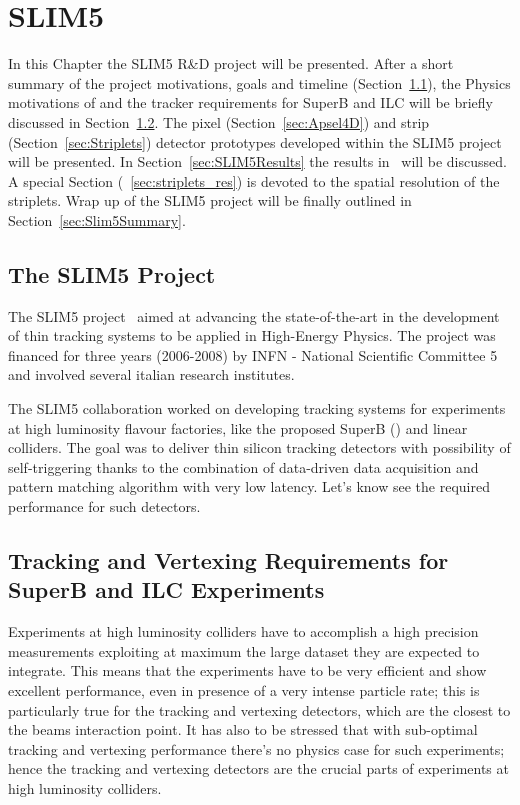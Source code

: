 \chapter{SLIM5}
\label{chap:SLIM5}
In this Chapter the SLIM5 R\&D project will be presented. After a short summary of the project 
motivations, goals and timeline (Section~\ref{sec:SLIM5Project}), the Physics motivations of 
and the tracker requirements for SuperB and ILC will be briefly discussed in Section~\ref{sec:HLExp}. 
The pixel  (Section~\ref{sec:Apsel4D}) and strip (Section~\ref{sec:Striplets}) 
detector prototypes developed 
within the SLIM5 project will be presented. In Section~\ref{sec:SLIM5Results} the results 
in~\cite{BETTARINI2010942,BOMBEN2010159,NERI2010195} will be discussed. 
A special Section (~\ref{sec:striplets_res}) is devoted to the spatial resolution of the striplets. 
Wrap up of the SLIM5 project will be finally outlined in Section~\ref{sec:Slim5Summary}.


\section{The SLIM5 Project}
\label{sec:SLIM5Project}
The SLIM5 project~\cite{SLIM5:proj} aimed at advancing the state-of-the-art in the development of thin 
tracking systems to be applied in High-Energy Physics. The project was financed for three years
 (2006-2008) by INFN - National Scientific Committee 5~\cite{INFN_V} and involved several 
 italian research institutes. 
 
 The SLIM5 collaboration worked on developing tracking systems for experiments at 
 high luminosity flavour 
 factories, like the proposed SuperB (\cite{Baszczyk:2013xua}) and linear colliders. The goal was to deliver thin silicon tracking detectors with possibility 
 of self-triggering thanks to the combination of data-driven data acquisition and pattern matching 
 algorithm with very low latency.
Let's know see the required performance for such detectors. 

\section{Tracking and Vertexing Requirements for SuperB and ILC Experiments}
\label{sec:HLExp}
Experiments at high luminosity colliders have to accomplish a high precision measurements 
exploiting at maximum the large dataset they are expected to integrate. 
This means that the experiments have to be very efficient and show excellent performance, 
even in presence of a very intense particle rate; this is particularly true for the tracking and 
vertexing detectors, which are the closest to the beams interaction point. It has also to be stressed 
that with sub-optimal tracking and vertexing performance there's no physics case for such 
experiments; hence the tracking and vertexing detectors are the crucial parts of experiments at 
high luminosity colliders.


